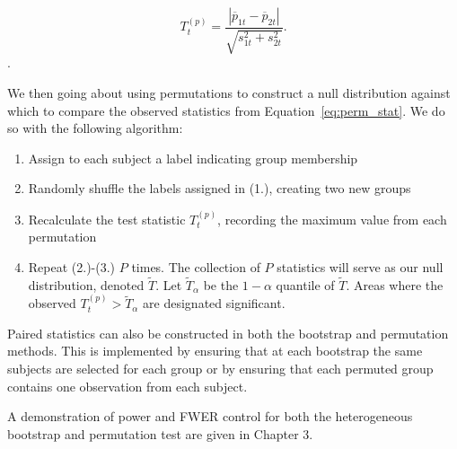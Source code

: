 \begin{equation}\label{eq:perm_stat}
T_t^{(p)} = \frac{|\overline{p}_{1t} - \overline{p}_{2t}|}{\sqrt{s_{1t}^2 + s_{2t}^2}}.
\end{equation}.

We then going about using permutations to construct a null distribution against which to compare the observed statistics from Equation~\ref{eq:perm_stat}. We do so with the following algorithm:

\begin{enumerate}
\item Assign to each subject a label indicating group membership
\item Randomly shuffle the labels assigned in (1.), creating two new groups 
\item Recalculate the test statistic $T^{(p)}_t$, recording the maximum value from each permutation
\item Repeat (2.)-(3.) $P$ times. The collection of $P$ statistics will serve as our null distribution, denoted $\widetilde{T}$. Let $\widetilde{T}_{\alpha}$ be the $1 - \alpha$ quantile of $\widetilde{T}$. Areas where the observed $T^{(p)}_t > \widetilde{T}_{\alpha}$ are designated significant.
\end{enumerate}

Paired statistics can also be constructed in both the bootstrap and permutation methods. This is implemented by ensuring that at each bootstrap the same subjects are selected for each group or by ensuring that each permuted group contains one observation from each subject.

A demonstration of power and FWER control for both the heterogeneous bootstrap and permutation test are given in Chapter 3.

%


